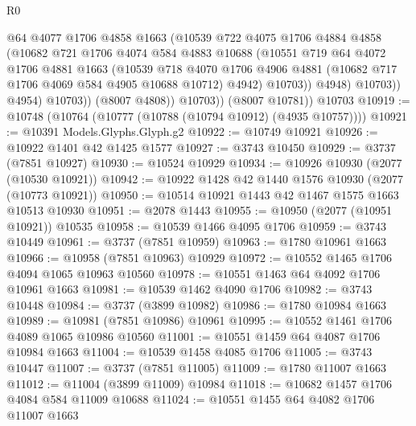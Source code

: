 \begin{lexlean}{R0}
\begin{coremodule}
                      @64
                      @4077
                      @1706
                      @4858
                      @1663
                      (@10539
                        @722
                        @4075
                        @1706
                        @4884
                        @4858
                        (@10682
                          @721
                          @1706
                          @4074
                          @584
                          @4883
                          @10688
                          (@10551
                            @719
                            @64
                            @4072
                            @1706
                            @4881
                            @1663
                            (@10539
                              @718
                              @4070
                              @1706
                              @4906
                              @4881
                              (@10682 @717 @1706 @4069 @584 @4905 @10688 @10712)
                              @4942)
                            @10703))
                        @4948)
                      @10703))
                  @4954)
                @10703))
            (@8007 @4808))
          @10703))
      (@8007 @10781))
    @10703
@10919 := @10748 (@10764 (@10777 (@10788 (@10794 @10912) (@4935 @10757))))
@10921 := @10391 Models.Glyphs.Glyph.g2
@10922 := @10749 @10921
@10926 := @10922 @1401 @42 @1425 @1577
@10927 := @3743 @10450
@10929 := @3737 (@7851 @10927)
@10930 := @10524 @10929
@10934 := @10926 @10930 (@2077 (@10530 @10921))
@10942 := @10922 @1428 @42 @1440 @1576 @10930 (@2077 (@10773 @10921))
@10950 := @10514 @10921 @1443 @42 @1467 @1575 @1663 @10513 @10930
@10951 := @2078 @1443
@10955 := @10950 (@2077 (@10951 @10921)) @10535
@10958 := @10539 @1466 @4095 @1706
@10959 := @3743 @10449
@10961 := @3737 (@7851 @10959)
@10963 := @1780 @10961 @1663
@10966 := @10958 (@7851 @10963) @10929
@10972 := @10552 @1465 @1706 @4094 @1065 @10963 @10560
@10978 := @10551 @1463 @64 @4092 @1706 @10961 @1663
@10981 := @10539 @1462 @4090 @1706
@10982 := @3743 @10448
@10984 := @3737 (@3899 @10982)
@10986 := @1780 @10984 @1663
@10989 := @10981 (@7851 @10986) @10961
@10995 := @10552 @1461 @1706 @4089 @1065 @10986 @10560
@11001 := @10551 @1459 @64 @4087 @1706 @10984 @1663
@11004 := @10539 @1458 @4085 @1706
@11005 := @3743 @10447
@11007 := @3737 (@7851 @11005)
@11009 := @1780 @11007 @1663
@11012 := @11004 (@3899 @11009) @10984
@11018 := @10682 @1457 @1706 @4084 @584 @11009 @10688
@11024 := @10551 @1455 @64 @4082 @1706 @11007 @1663

\end{coremodule}
\end{lexlean}
